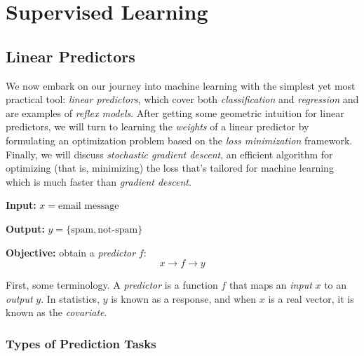 \chapter{Supervised Learning} %
\label{cha:supervised_learning}


\section{Linear Predictors} %
\label{sec:linear_predictors}

We now embark on our journey into machine learning with the simplest yet most practical tool: \textit{linear predictors}, which cover both \textit{classification} and \textit{regression} and are examples of \textit{reflex models}.
% 
After getting some geometric intuition for linear predictors, we will turn to learning the \textit{weights} of a linear predictor by formulating an optimization problem based on the \textit{loss minimization} framework.
% 
Finally, we will discuss \textit{stochastic gradient descent}, an efficient algorithm for optimizing (that is, minimizing) the loss that's tailored for machine learning which is much faster than \textit{gradient descent}.

\begin{example}
    
    \br

    \textbf{Input:} $x = \text{email message}$

    \textbf{Output:} $y = \{ \text{spam}, \text{not-spam}\}$

    \textbf{Objective:} obtain a \textit{predictor} $f$:
    \[
        x \longrightarrow \boxed{f} \longrightarrow y
    \]
\end{example}
First, some terminology. A \textit{predictor} is a function $f$ that maps an \textit{input} $x$ to an \textit{output} $y$. In statistics, $y$ is known as a response, and when $x$ is a real vector, it is known as the \textit{covariate}.




\subsection{Types of Prediction Tasks} %
\label{sub:types_of_prediction_tasks}

